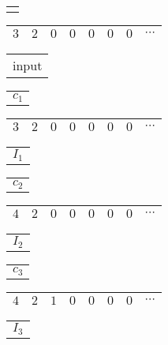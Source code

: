 \documentclass[12pt]{article}
\begin{document}
\begin{center}
\begin{tabular}{ p{0.5cm} }
\hspace{1 pt}
\end{tabular}
\begin{tabular}{|c|c|c|c|c|c|c|c}
\hline
$3$ & $2$ & $0$ & $0$ & $0$ & $0$ & $0$ & $\cdots$ \\
\hline
\end{tabular}
\begin{tabular}{ p{0.5cm} }
input
\end{tabular}
\end{center}
\vspace{-0.75cm}
\begin{center}
\begin{tabular}{ p{0.5cm} }
$c_1$
\end{tabular}
\begin{tabular}{|c|c|c|c|c|c|c|c}
\hline
$3$ & $2$ & $0$ & $0$ & $0$ & $0$ & $0$ & $\cdots$ \\
\hline
\end{tabular}
\begin{tabular}{ p{0.5cm} }
$I_1$
\end{tabular}
\end{center}
\vspace{-0.75cm}
\begin{center}
\begin{tabular}{ p{0.5cm} }
$c_2$
\end{tabular}
\begin{tabular}{|c|c|c|c|c|c|c|c}
\hline
$4$ & $2$ & $0$ & $0$ & $0$ & $0$ & $0$ & $\cdots$ \\
\hline
\end{tabular}
\begin{tabular}{ p{0.5cm} }
$I_2$
\end{tabular}
\end{center}
\vspace{-0.75cm}
\begin{center}
\begin{tabular}{ p{0.5cm} }
$c_3$
\end{tabular}
\begin{tabular}{|c|c|c|c|c|c|c|c}
\hline
$4$ & $2$ & $1$ & $0$ & $0$ & $0$ & $0$ & $\cdots$ \\
\hline
\end{tabular}
\begin{tabular}{ p{0.5cm} }
$I_3$
\end{tabular}
\end{center}
\end{document}

